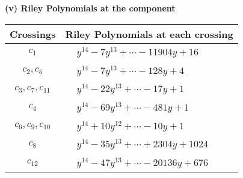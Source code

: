 \documentclass[1p]{elsarticle_modified}
\theoremstyle{definition}
\begin{document}
\flushleft \textbf{(v) Riley Polynomials at the component}\newline \\
\begin{tabular}{m{50pt}|m{274pt}}
Crossings & \hspace{64pt}Riley Polynomials at each crossing \\
\hline $$\begin{aligned}c_{1}\end{aligned}$$&$\begin{aligned}
&y^{14}-7 y^{13}+\cdots-11904 y+16
\end{aligned}$\\
\hline $$\begin{aligned}c_{2},c_{5}\end{aligned}$$&$\begin{aligned}
&y^{14}-7 y^{13}+\cdots-128 y+4
\end{aligned}$\\
\hline $$\begin{aligned}c_{3},c_{7},c_{11}\end{aligned}$$&$\begin{aligned}
&y^{14}-22 y^{13}+\cdots-17 y+1
\end{aligned}$\\
\hline $$\begin{aligned}c_{4}\end{aligned}$$&$\begin{aligned}
&y^{14}-69 y^{13}+\cdots-481 y+1
\end{aligned}$\\
\hline $$\begin{aligned}c_{6},c_{9},c_{10}\end{aligned}$$&$\begin{aligned}
&y^{14}+10 y^{12}+\cdots-10 y+1
\end{aligned}$\\
\hline $$\begin{aligned}c_{8}\end{aligned}$$&$\begin{aligned}
&y^{14}-35 y^{13}+\cdots+2304 y+1024
\end{aligned}$\\
\hline $$\begin{aligned}c_{12}\end{aligned}$$&$\begin{aligned}
&y^{14}-47 y^{13}+\cdots-20136 y+676
\end{aligned}$\\
\hline
\end{tabular}\\~\\
\end{document}
